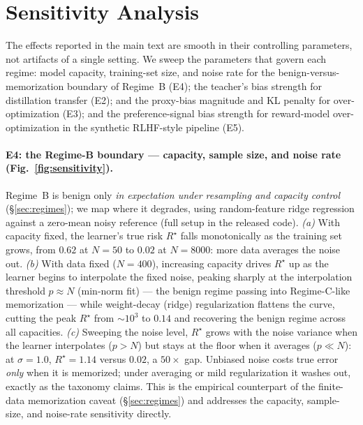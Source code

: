 \documentclass[10pt]{article} %
\theoremstyle{plain}
\theoremstyle{remark}
\begin{document}
\section{Sensitivity Analysis}
\label{app:robust}
The effects reported in the main text are smooth in their controlling parameters, not artifacts of a single setting. We sweep the parameters that govern each regime: model capacity, training-set size, and noise rate for the benign-versus-memorization boundary of Regime~B (E4); the teacher's bias strength for distillation transfer (E2); and the proxy-bias magnitude and KL penalty for over-optimization (E3); and the preference-signal bias strength for reward-model over-optimization in the synthetic RLHF-style pipeline (E5).

\paragraph{E4: the Regime-B boundary --- capacity, sample size, and noise rate (Fig.~\ref{fig:sensitivity}).} Regime~B is benign only \emph{in expectation under resampling and capacity control} (\S\ref{sec:regimes}); we map where it degrades, using random-feature ridge regression against a zero-mean noisy reference (full setup in the released code). \emph{(a)} With capacity fixed, the learner's true risk $R^\star$ falls monotonically as the training set grows, from $0.62$ at $N=50$ to $0.02$ at $N=8000$: more data averages the noise out. \emph{(b)} With data fixed ($N=400$), increasing capacity drives $R^\star$ up as the learner begins to interpolate the fixed noise, peaking sharply at the interpolation threshold $p\approx N$ (min-norm fit) --- the benign regime passing into Regime-C-like memorization --- while weight-decay (ridge) regularization flattens the curve, cutting the peak $R^\star$ from ${\sim}10^{3}$ to $0.14$ and recovering the benign regime across all capacities. \emph{(c)} Sweeping the noise level, $R^\star$ grows with the noise variance when the learner interpolates ($p>N$) but stays at the floor when it averages ($p\ll N$): at $\sigma=1.0$, $R^\star=1.14$ versus $0.02$, a $50{\times}$ gap. Unbiased noise costs true error \emph{only} when it is memorized; under averaging or mild regularization it washes out, exactly as the taxonomy claims. This is the empirical counterpart of the finite-data memorization caveat (\S\ref{sec:regimes}) and addresses the capacity, sample-size, and noise-rate sensitivity directly.
\end{document}
